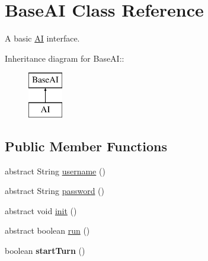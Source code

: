 \hypertarget{classBaseAI}{
\section{BaseAI Class Reference}
\label{classBaseAI}
}
A basic \hyperlink{classAI}{AI} interface.  


Inheritance diagram for BaseAI::\begin{figure}[H]
\begin{center}
\leavevmode
\includegraphics[height=2cm]{classBaseAI}
\end{center}
\end{figure}
\subsection*{Public Member Functions}
\begin{CompactItemize}
\item 
abstract String \hyperlink{classBaseAI_a26770dd7db8dd0c4466dd770d4e05ba}{username} ()
\item 
abstract String \hyperlink{classBaseAI_8607533e2b5bd9920ded593ae6509f48}{password} ()
\item 
abstract void \hyperlink{classBaseAI_71b49f4ca248bfd32a9f9557cb6d494a}{init} ()
\item 
abstract boolean \hyperlink{classBaseAI_56c96a58c1f1e93d17f9817711a45594}{run} ()
\item 
\hypertarget{classBaseAI_862e05b3099817fcceb55beeef7225fe}{
boolean \textbf{startTurn} ()}
\label{classBaseAI_862e05b3099817fcceb55beeef7225fe}

\end{CompactItemize}
